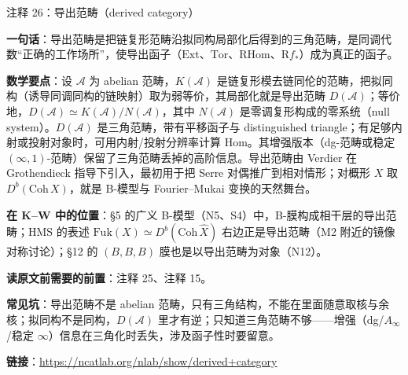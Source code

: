 \begin{kcard}{注释 26：导出范畴（derived category）}

\textbf{一句话}：导出范畴是把链复形范畴沿拟同构局部化后得到的三角范畴，是同调代数“正确的工作场所”，使导出函子（$\mathrm{Ext}$、$\mathrm{Tor}$、$\mathrm{RHom}$、$\mathrm{R}f_*$）成为真正的函子。

\textbf{数学要点}：设 $\mathcal A$ 为 abelian 范畴，$K(\mathcal A)$ 是链复形模去链同伦的范畴，把拟同构（诱导同调同构的链映射）取为弱等价，其局部化就是导出范畴 $D(\mathcal A)$；等价地，$D(\mathcal A)\simeq K(\mathcal A)/N(\mathcal A)$，其中 $N(\mathcal A)$ 是零调复形构成的零系统（null system）。$D(\mathcal A)$ 是三角范畴，带有平移函子与 distinguished triangle；有足够内射或投射对象时，可用内射/投射分辨率计算 Hom。其增强版本（dg-范畴或稳定 $(\infty,1)$-范畴）保留了三角范畴丢掉的高阶信息。导出范畴由 Verdier 在 Grothendieck 指导下引入，最初用于把 Serre 对偶推广到相对情形；对概形 $X$ 取 $D^b(\mathrm{Coh}\,X)$，就是 B-模型与 Fourier--Mukai 变换的天然舞台。

\textbf{在 K--W 中的位置}：§5 的广义 B-模型（N5、S4）中，B-膜构成相干层的导出范畴；HMS 的表述 $\mathrm{Fuk}(X)\simeq D^b(\mathrm{Coh}\,\hat X)$ 右边正是导出范畴（M2 附近的镜像对称讨论）；§12 的 $(B,B,B)$ 膜也是以导出范畴为对象（N12）。

\textbf{读原文前需要的前置}：注释 25、注释 15。

\textbf{常见坑}：导出范畴不是 abelian 范畴，只有三角结构，不能在里面随意取核与余核；拟同构不是同构，$D(\mathcal A)$ 里才有逆；只知道三角范畴不够——增强（dg/$A_\infty$/稳定 $\infty$）信息在三角化时丢失，涉及函子性时要留意。

\noindent\textbf{链接}：\url{https://ncatlab.org/nlab/show/derived+category}
\end{kcard}

